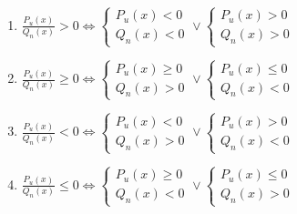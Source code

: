 \documentclass[12pt]{report}
\begin{document}
\begin{center}
  \begin{varwidth}{\textwidth}
    \begin{enumerate}[label=\Roman*.]
      \item 
        $\frac{P_u(x)}{Q_n(x)} > 0 
        \Leftrightarrow
        \left\{ 
          \begin{array}{rcl}
            P_u(x) < 0 \\
            Q_n(x) < 0
          \end{array}
        \right.
        \vee
        \left\{ 
          \begin{array}{rcl}
          P_u(x) > 0 \\
          Q_n(x) > 0
          \end{array}
        \right.$ \vspace{2mm}

      \item 
        $\frac{P_u(x)}{Q_n(x)} \ge 0 
        \Leftrightarrow
        \left\{ 
          \begin{array}{rcl}
            P_u(x) \ge 0 \\
            Q_n(x) > 0
          \end{array}
        \right.
        \vee
        \left\{ 
          \begin{array}{rcl}
          P_u(x) \le 0 \\
          Q_n(x) < 0
          \end{array}
        \right.$ \vspace{2mm}

      \item 
        $\frac{P_u(x)}{Q_n(x)} < 0 
        \Leftrightarrow
        \left\{ 
          \begin{array}{rcl}
            P_u(x) < 0 \\
            Q_n(x) > 0
          \end{array}
        \right.
        \vee
        \left\{ 
          \begin{array}{rcl}
          P_u(x) > 0 \\
          Q_n(x) < 0
          \end{array}
        \right.$ \vspace{2mm}

      \item 
        $\frac{P_u(x)}{Q_n(x)} \le 0 
        \Leftrightarrow
        \left\{ 
          \begin{array}{rcl}
            P_u(x) \ge 0 \\
            Q_n(x) < 0
          \end{array}
        \right.
        \vee
        \left\{ 
          \begin{array}{rcl}
          P_u(x) \le 0 \\
          Q_n(x) > 0
          \end{array}
        \right.$ \vspace{2mm}


    \end{enumerate}
  \end{varwidth}
\end{center}
\end{document}

